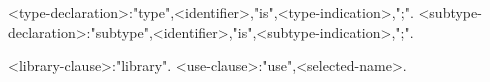 <type-declaration>:"type",<identifier>,"is",<type-indication>,";".
<subtype-declaration>:"subtype",<identifier>,"is",<subtype-indication>,";".

<library-clause>:"library".
<use-clause>:"use",<selected-name>.